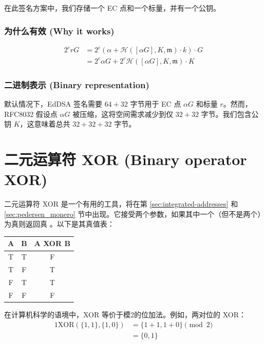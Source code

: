 在此签名方案中，我们存储一个 EC 点和一个标量，并有一个公钥。

\subsubsection*{为什么有效 (Why it works)}
\begin{align*}
2^c r G &= 2^c (\alpha + \mathcal{H}([\alpha G], K,  \mathfrak{m}) \cdot k) \cdot G \\
		&= 2^c \alpha G + 2^c \mathcal{H}([\alpha G], K,  \mathfrak{m}) \cdot K 
\end{align*}

\subsubsection*{二进制表示 (Binary representation)}

默认情况下，EdDSA 签名需要 \(64 + 32\) 字节用于 EC 点 $\alpha G$ 和标量 $r$。然而，RFC8032 假设点 \(\alpha G\) 被压缩，这将空间需求减少到仅 \(32 + 32\) 字节。我们包含公钥 $K$，这意味着总共 \(32 + 32 + 32\) 字节。



\section{二元运算符 XOR (Binary operator XOR)}
\label{sec:XOR_section}

二元运算符 XOR 是一个有用的工具，将在第 \ref{sec:integrated-addresses} 和 \ref{sec:pedersen_monero} 节中出现。它接受两个参数，如果其中一个（但不是两个）为真则返回真 \cite{wolfram-xor}。以下是其真值表：

\begin{center}
    \begin{tabular}{|c|c|c|}
    \hline
        A & B & A XOR B \\
    \hline\hline
        T & T & F \\
    \hline
        T & F & T \\
    \hline
        F & T & T \\
    \hline
        F & F & F \\
    \hline
    \end{tabular}
\end{center}

在计算机科学的语境中，XOR 等价于模2的位加法。例如，两对位的 XOR：
\begin{alignat*}{1}
    \text{XOR}(\{1,1\},\{1,0\}) &= \{1+1,1+0\} \pmod 2 \\
                                &= \{0,1\} 
\end{alignat*}

